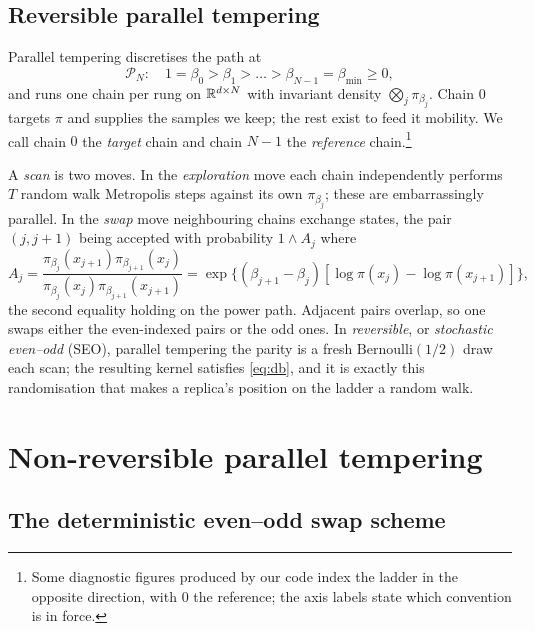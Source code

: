 \subsection{Reversible parallel tempering}

Parallel tempering discretises the path at
\begin{equation}
  \mathcal P_N:\quad 1=\beta_0>\beta_1>\dots>\beta_{N-1}=\beta_{\min}\ge0,
\end{equation}
and runs one chain per rung on $\mathbb{R}^{d\times N}$ with invariant density
$\bigotimes_j\pi_{\beta_j}$. Chain $0$ targets $\pi$ and supplies the samples we
keep; the rest exist to feed it mobility. We call chain $0$ the \emph{target}
chain and chain $N-1$ the \emph{reference} chain.\footnote{Some diagnostic
figures produced by our code index the ladder in the opposite direction, with $0$
the reference; the axis labels state which convention is in force.}

A \emph{scan} is two moves. In the \emph{exploration} move each chain
independently performs $T$ random walk Metropolis steps against its own
$\pi_{\beta_j}$; these are embarrassingly parallel. In the \emph{swap} move
neighbouring chains exchange states, the pair $(j,j+1)$ being accepted with
probability $1\wedge A_j$ where
\begin{equation}
  A_j=\frac{\pi_{\beta_j}(x_{j+1})\pi_{\beta_{j+1}}(x_j)}
           {\pi_{\beta_j}(x_j)\pi_{\beta_{j+1}}(x_{j+1})}
     =\exp\!\big\{(\beta_{j+1}-\beta_j)[\log\pi(x_j)-\log\pi(x_{j+1})]\big\},
  \label{eq:swapratio}
\end{equation}
the second equality holding on the power path. Adjacent pairs overlap, so one
swaps either the even-indexed pairs or the odd ones. In \emph{reversible}, or
\emph{stochastic even--odd} (SEO), parallel tempering the parity is a fresh
$\mathrm{Bernoulli}(1/2)$ draw each scan; the resulting kernel satisfies
\eqref{eq:db}, and it is exactly this randomisation that makes a replica's
position on the ladder a random walk.


\section{Non-reversible parallel tempering}
\label{sec:nrpt}

\subsection{The deterministic even--odd swap scheme}

